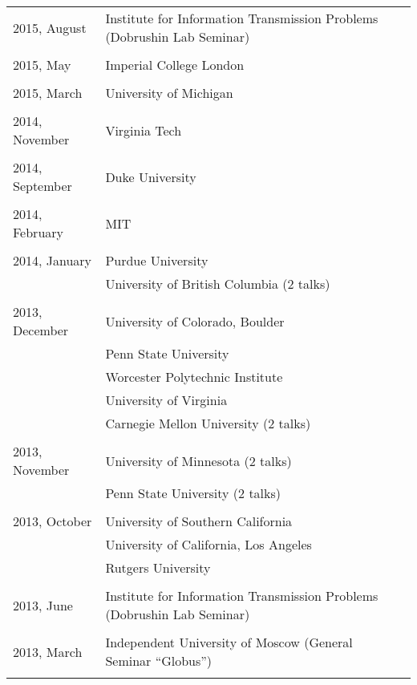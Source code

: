 \documentclass[letterpaper,11pt]{article}
\begin{document}
\begin{longtable}{llc}
	2015, August
	& Institute for Information Transmission Problems
	(Dobrushin Lab Seminar)
	\\\\

	2015, May
	& Imperial College London
	\\\\

	2015, March
	& University of Michigan
	\\\\

	2014, November
	& Virginia Tech\\\\

	2014, September
	& Duke University\\\\

	2014, February
	& MIT\\\\

	2014, January
	  & Purdue University & \hspace{110pt}
	\\& University of British Columbia (2 talks)\\\\

	2013, December
	& University of Colorado, Boulder
	\\&Penn State University\\&Worcester Polytechnic Institute
	\\&University of Virginia\\&
	Carnegie Mellon University (2 talks)\\\\

	2013, November&
	University of Minnesota (2 talks)\\&
	Penn State University (2 talks)\\\\

	2013, October&
	University of Southern California
	\\&
	University of California, Los Angeles
	\\&Rutgers University\\\\

	2013, June& Institute for Information Transmission Problems
	(Dobrushin Lab Seminar)\\\\

	2013, March& Independent University of Moscow (General Seminar
	``Globus'')\\\\


\end{longtable}
\end{document}
